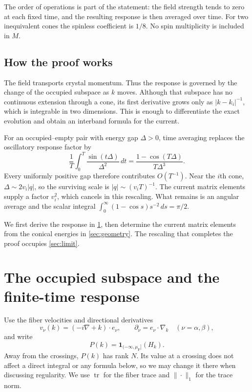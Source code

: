 \documentclass[11pt,a4paper]{article}
\newcommand{\ind}{\mathbf 1}
\DeclareMathOperator{\tr}{tr}
\theoremstyle{remark}
\numberwithin{equation}{section}
\begin{document}
The order of operations is part of the statement: the field strength
tends to zero at each fixed time, and the resulting response is then
averaged over time. For two inequivalent cones the spinless coefficient
is $1/8$. No spin multiplicity is included in $M$.

\subsection{How the proof works}

The field transports crystal momentum. Thus the response is governed by
the change of the occupied subspace as $k$ moves. Although that subspace
has no continuous extension through a cone, its first derivative grows
only as $|k-k_i|^{-1}$, which is integrable in two dimensions. This is
enough to differentiate the exact evolution and obtain an interband
formula for the current.

For an occupied--empty pair with energy gap $\Delta>0$, time averaging
replaces the oscillatory response factor by
\begin{equation}\label{eq:kernel-preview}
 \frac1T\int_0^T\frac{\sin(t\Delta)}{\Delta^2}\,dt
   =\frac{1-\cos(T\Delta)}{T\Delta^3}.
\end{equation}
Every uniformly positive gap therefore contributes $O(T^{-1})$.
Near the $i$th cone, $\Delta\sim2v_i|q|$, so the surviving scale is
$|q|\sim(v_iT)^{-1}$. The current matrix elements supply a factor $v_i^2$,
which cancels in this rescaling. What remains is an angular average and
the scalar integral $\int_0^\infty(1-\cos s)s^{-2}\,ds=\pi/2$.

We first derive the response in \cref{sec:response}, then determine the
current matrix elements from the conical energies in \cref{sec:geometry}.
The rescaling that completes the proof occupies \cref{sec:limit}.

\section{The occupied subspace and the finite-time response}
\label{sec:response}

Use the fiber velocities and directional derivatives
\[
 v_\nu(k)=(-i\nabla+k)\cdot e_\nu,
 \qquad \partial_\nu=e_\nu\cdot\nabla_k
 \quad(\nu=\alpha,\beta),
\]
and write
\begin{equation}\label{eq:P}
 P(k)=\ind_{(-\infty,\mu_{\mathrm F}]}(H_k).
\end{equation}
Away from the crossings, $P(k)$ has rank $N$. Its value at a crossing
does not affect a direct integral or any formula below, so we may change
it there when discussing regularity. We use $\tr$ for the fiber trace
and $\|\cdot\|_1$ for the trace norm.
\end{document}
